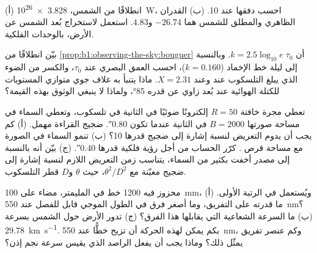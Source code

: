 \begin{exercise}[$\star\star$]\label{exo:b1:observing-the-sky:9}
(أ) انطلاقًا من  الشمس، \qty{3.828e26}{W}، احسب دفقها عند \qty{10}{\parsec}. (ب) القدران الظاهري والمطلق للشمس هما $-26.74$ و$4.83$. استعمل  لاستخراج بُعد الشمس عن الأرض، بالوحدات الفلكية.
\end{exercise}

\begin{exercise}[$\star\star\star$]\label{exo:b1:observing-the-sky:10}
بيّن انطلاقًا من \cref{prop:b1:observing-the-sky:bouguer} أن $k =
2.5\log_{10}e\;\tau_0$. وبالنسبة إلى ليلة خط الإخماد ($k =
\num{0.160}$)، احسب العمق البصري عند  $\tau_0$، والكسر من الضوء الذي يبلغ التلسكوب عند  وعند $X = 2.31$. ماذا يتنبأ به غلاف جوي متوازي المستويات للكتلة الهوائية عند بُعد زاوي عن  قدره \ang{85}، ولماذا لا ينبغي الوثوق بهذه القيمة؟
\end{exercise}

\begin{exercise}[$\star\star\star$]\label{exo:b1:observing-the-sky:11}
تعطي مجرة خافتة $R = 50$ إلكترونًا ضوئيًا في الثانية في تلسكوب، وتعطي السماء في مساحة صورتها $B = \num{2000}$ في الثانية عندما تكون  \ang{;;0.80}. ضجيج القراءة مهمل. (أ) كم يجب أن يدوم التعريض لنسبة إشارة إلى ضجيج قدرها 10؟ (ب) تنمو السماء في الصورة مع مساحة قرص . كرّر الحساب من أجل رؤية فلكية قدرها \ang{;;0.40}. (ج) بيّن أنه بالنسبة إلى مصدر أخفت بكثير من السماء، يتناسب زمن التعريض اللازم لنسبة إشارة إلى ضجيج معيّنة مع $\theta^2/D^2$، حيث $\theta$  و$D$ قطر التلسكوب.
\end{exercise}

\begin{exercise}[$\star\star\star$]\label{exo:b1:observing-the-sky:12}
محزوز فيه 1200 خط في المليمتر، مضاء على \qty{100}{mm}، ويُستعمل في الرتبة الأولى. (أ) ما قدرته على التفريق، وما أصغر فرق في الطول الموجي قابل للفصل عند \qty{550}{nm}؟ (ب) ما السرعة الشعاعية التي يقابلها هذا الفرق؟ (ج) تدور الأرض حول الشمس بسرعة \qty{29.78}{km.s^{-1}}. بكم يمكن لهذه الحركة أن تزيح خطًّا عند \qty{550}{nm}، وكم عنصر تفريق يمثّل ذلك؟ وماذا يجب أن يفعل الراصد الذي يقيس سرعة نجم إذن؟
\end{exercise}

